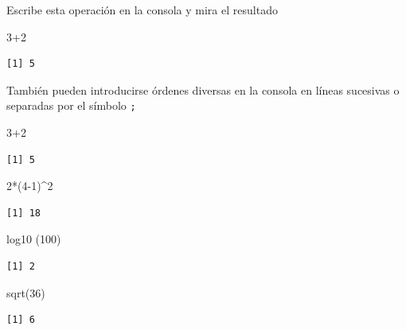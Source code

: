\documentclass[
  letterpaper,
  DIV=11,
  numbers=noendperiod]{scrartcl}
\newenvironment{Shaded}{\begin{snugshade}}{\end{snugshade}}
\newcommand{\DecValTok}[1]{\textcolor[rgb]{0.68,0.00,0.00}{#1}}
\newcommand{\FunctionTok}[1]{\textcolor[rgb]{0.28,0.35,0.67}{#1}}
\newcommand{\NormalTok}[1]{\textcolor[rgb]{0.00,0.23,0.31}{#1}}
\newcommand{\SpecialCharTok}[1]{\textcolor[rgb]{0.37,0.37,0.37}{#1}}
\begin{document}
Escribe esta operación en la consola y mira el resultado

\begin{Shaded}
\begin{Highlighting}[]
\DecValTok{3}\SpecialCharTok{+}\DecValTok{2}
\end{Highlighting}
\end{Shaded}

\begin{verbatim}
[1] 5
\end{verbatim}

También pueden introducirse órdenes diversas en la consola en líneas
sucesivas o separadas por el símbolo \texttt{;}

\begin{Shaded}
\begin{Highlighting}[]
\DecValTok{3}\SpecialCharTok{+}\DecValTok{2} 
\end{Highlighting}
\end{Shaded}

\begin{verbatim}
[1] 5
\end{verbatim}

\begin{Shaded}
\begin{Highlighting}[]
\DecValTok{2}\SpecialCharTok{*}\NormalTok{(}\DecValTok{4{-}1}\NormalTok{)}\SpecialCharTok{\^{}}\DecValTok{2} 
\end{Highlighting}
\end{Shaded}

\begin{verbatim}
[1] 18
\end{verbatim}

\begin{Shaded}
\begin{Highlighting}[]
\FunctionTok{log10}\NormalTok{ (}\DecValTok{100}\NormalTok{) }
\end{Highlighting}
\end{Shaded}

\begin{verbatim}
[1] 2
\end{verbatim}

\begin{Shaded}
\begin{Highlighting}[]
\FunctionTok{sqrt}\NormalTok{(}\DecValTok{36}\NormalTok{)}
\end{Highlighting}
\end{Shaded}

\begin{verbatim}
[1] 6
\end{verbatim}
\end{document}
